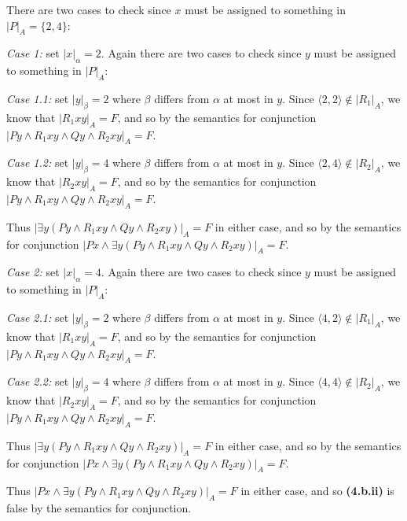 \documentclass[a4paper, 11pt]{article} %
\newenvironment{Answer}[1][Answer]
  {\proof[#1]\leftskip=1cm\rightskip=1cm}
  {\endproof}
\newcommand{\tuple}[1]{\langle#1\rangle} %
\newcommand{\set}[1]{\lbrace#1\rbrace} %
\theoremstyle{theorem}
\theoremstyle{Pthm}
\begin{document}
\begin{Answer}
  There are two cases to check since $x$ must be assigned to something in $ |P|_A = \set{2,4}$:
    
    \textit{Case 1:}
      set $ |x|_\alpha = 2 $.
      Again there are two cases to check since $y$ must be assigned to something in $ |P|_A $:

        \textit{Case 1.1:}
        set $ |y|_\beta = 2 $ where $\beta$ differs from $\alpha$ at most in $y$.
        Since $ \tuple{2,2} \notin |R_1|_A $, we know that
          $ |R_1xy|_A = F $, and so by the semantics for conjunction
          $ | Py \wedge R_1xy \wedge Qy \wedge R_2xy |_A = F $.

        \textit{Case 1.2:}
        set $ |y|_\beta = 4 $ where $\beta$ differs from $\alpha$ at most in $y$.
        Since $ \tuple{2,4} \notin |R_2|_A $, we know that
          $ |R_2xy|_A = F $, and so by the semantics for conjunction
          $ | Py \wedge R_1xy \wedge Qy \wedge R_2xy |_A = F $.

      Thus $|\exists y (Py \wedge R_1xy \wedge Qy \wedge R_2xy)|_A = F $ in either case,
        and so by the semantics for conjunction $|Px \wedge \exists y (Py \wedge R_1xy \wedge Qy \wedge R_2xy)|_A = F $.

    \textit{Case 2:}
      set $ |x|_\alpha = 4 $.
      Again there are two cases to check since $y$ must be assigned to something in $ |P|_A $:

        \textit{Case 2.1:}
        set $ |y|_\beta = 2 $ where $\beta$ differs from $\alpha$ at most in $y$.
        Since $ \tuple{4,2} \notin |R_1|_A $, we know that
          $ |R_1xy|_A = F $, and so by the semantics for conjunction
          $ | Py \wedge R_1xy \wedge Qy \wedge R_2xy |_A = F $.

        \textit{Case 2.2:}
        set $ |y|_\beta = 4 $ where $\beta$ differs from $\alpha$ at most in $y$.
        Since $ \tuple{4,4} \notin |R_2|_A $, we know that
          $ |R_2xy|_A = F $, and so by the semantics for conjunction
          $ | Py \wedge R_1xy \wedge Qy \wedge R_2xy |_A = F $.
      
      Thus $|\exists y (Py \wedge R_1xy \wedge Qy \wedge R_2xy)|_A = F $ in either case,
        and so by the semantics for conjunction $|Px \wedge \exists y (Py \wedge R_1xy \wedge Qy \wedge R_2xy)|_A = F $.

    Thus $|Px \wedge \exists y (Py \wedge R_1xy \wedge Qy \wedge R_2xy)|_A = F $ in either case, and so \textbf{(4.b.ii)} is false by the semantics for conjunction.

\end{Answer}
\end{document}
